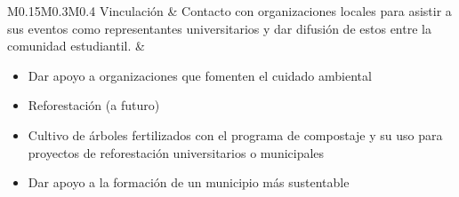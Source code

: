 \begin{table}
{\begin{tabular}{M{0.15\linewidth}M{0.3\linewidth}M{0.4\linewidth}}
        Vinculación
        &
        Contacto con organizaciones locales para asistir a sus eventos como representantes universitarios y dar difusión de estos entre la comunidad estudiantil.
        &
        \begin{itemize}
            \item Dar apoyo a organizaciones que fomenten el cuidado ambiental
            \item Reforestación (a futuro)
            \item Cultivo de árboles fertilizados con el programa de compostaje y su uso para proyectos de reforestación universitarios o municipales
            \item Dar apoyo a la formación de un municipio más sustentable
        \end{itemize} 
        \\

    \hline\end{tabular}}
\end{table}